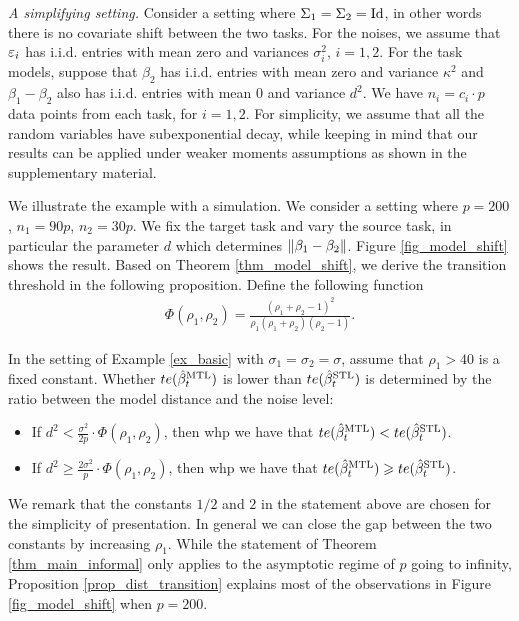 \textit{A simplifying setting.}\label{ex_basic}
	Consider a setting where $\Sigma_1 = \Sigma_2 = \operatorname{Id}$, in other words there is no covariate shift between the two tasks. For the noises, we assume that ${\varepsilon}_i$ has i.i.d. entries with mean zero and variances $\sigma_i^2$, $i=1,2$. 
	For the task models, suppose that $\beta_2$ has i.i.d. entries with mean zero and variance $\kappa^2$ and $\beta_1 - \beta_2$ also has i.i.d. entries with mean $0$ and variance $d^2$.
	We have $n_i = c_i \cdot p$ data points from each task, for $i = 1, 2$.
	For simplicity, we assume that all the random variables have subexponential decay, while keeping in mind that our results can be applied under weaker moments assumptions as shown in the supplementary material.

We illustrate the example with a simulation.
We consider a setting where $p = 200$, $n_1 = 90p$, $n_2 = 30p$.
We fix the target task and vary the source task, in particular the parameter $d$ which determines $\|\beta_1 - \beta_2\|$.
Figure \ref{fig_model_shift} shows the result.
Based on Theorem \ref{thm_model_shift}, we derive the transition threshold in the following proposition.
Define the following function
\begin{align*}
	\Phi(\rho_1, \rho_2) = \frac{(\rho_1 + \rho_2 - 1)^2}{\rho_1 (\rho_1 + \rho_2) (\rho_2 - 1)}.
\end{align*}

\begin{proposition}\label{prop_dist_transition}
	In the setting of Example \ref{ex_basic} with $\sigma_1 = \sigma_2 = \sigma$, assume that $\rho_1 > 40$ is a fixed constant.
	Whether $te(\hat{\beta}_t^{\text{MTL}})$ is lower than $te(\hat{\beta}_t^{\text{STL}})$ is determined by the ratio between the model distance and the noise level:
	\begin{itemize}
		\item If ${d^2} < \frac {\sigma^2} {2p} \cdot \Phi(\rho_1, \rho_2)$, then whp we have that $te(\hat{\beta}_t^{\text{MTL}}) < te(\hat{\beta}_t^{\text{STL}})$.
		\item If ${d^2} \ge \frac {2\sigma^2} {p} \cdot \Phi(\rho_1, \rho_2)$, then whp we have that $te(\hat{\beta}_t^{\text{MTL}}) \geqslant te(\hat{\beta}_t^{\text{STL}})$.
	\end{itemize}
\end{proposition}

We remark that the constants $1/2$ and $2$ in the statement above are chosen for the simplicity of presentation.
In general we can close the gap between the two constants by increasing $\rho_1$.
While the statement of Theorem \ref{thm_main_informal} only applies to the asymptotic regime of $p$ going to infinity, Proposition \ref{prop_dist_transition} explains most of the observations in Figure \ref{fig_model_shift} when $p = 200$.

